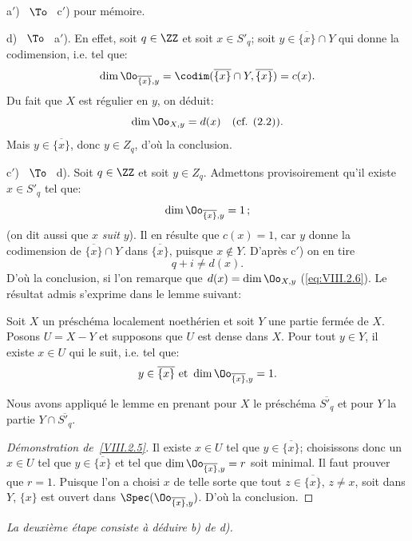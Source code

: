 a$'$) ~$\To$~ c$'$) pour m\'emoire.

d) ~$\To$~ a$'$). En effet, soit $q\in \ZZ$ et soit $x\in S'_q$; soit $y\in\overline{\{x\}}\cap Y$ qui \og donne la codimension\fg, i.e. tel que:
\begin{equation} \label{eq:VIII.2.5} \dim \Oo_{\overline{\{x\}}, y}=\codim(\overline{\{x\}}\cap Y, \overline{\{x\}})=c(x).
\end{equation}
Du fait que $X$ est r\'egulier en $y$, on d\'eduit:
\begin{equation} \label{eq:VIII.2.6} \dim \Oo_{X, y}=d(x)\quad \text{(cf. (2.2)).}
\end{equation}
Mais $y\in\overline{\{x\}}$, donc $y\in Z_q$, d'o\`u la conclusion.

c$'$) ~$\To$~ d). Soit $q\in\ZZ$ et soit $y\in Z_q$. Admettons provisoirement qu'il existe $x\in S'_q$ tel que:
\[
\dim \Oo_{\overline{\{x\}}, y}=1\, \text{;}\]
(on dit aussi que $x$ \emph{suit} $y$). Il en r\'esulte que $c(x)=1$, car $y$ \og donne la codimension de $\overline{\{x\}}\cap Y$ dans $\overline{\{x\}}$\fg, puisque $x\not\in Y$. D'apr\`es c$'$) on en tire
\[q+i\neq d(x).
\]
D'o\`u la conclusion, si l'on remarque que $d(x)=\dim \Oo_{X, y}$ (\ref{eq:VIII.2.6}). Le r\'esultat admis s'exprime dans le lemme suivant:

\begin{lemme} \label{VIII.2.5} Soit $X$ un pr\'esch\'ema localement noeth\'erien et soit $Y$ une partie ferm\'ee de $X$. Posons $U=X-Y$ et supposons que $U$ est dense dans $X$. Pour tout $y\in Y$, il existe $x\in U$ \og qui le suit\fg, i.e. tel que:
\[y\in\overline{\{x\}}\text{ et } \dim\Oo_{\overline{\{x\}}, y}=1.
\]
\end{lemme}

Nous avons appliqu\'e le lemme en prenant pour $X$ le pr\'esch\'ema $\overline{S'_q}$ et pour $Y$ la partie $Y\cap \overline{S'_q}$.

\begin{proof}[D\'emonstration de~\ref{VIII.2.5}]
Il existe $x\in U$ tel que $y\in\overline{\{x\}}$; choisissons donc un $x\in U$ tel que $y\in\overline{\{x\}}$ et tel que $\dim \Oo_{\overline{\{x\}}, y}=r$ soit minimal. Il faut prouver que $r=1$. Puisque l'on a choisi $x$ de telle sorte que tout $z\in\overline{\{x\}}$, $z\neq x$, soit dans $Y$, $\{x\}$ est ouvert dans $\Spec(\Oo_{\overline{\{x\}}, y})$. D'o\`u la conclusion.
\skipqed
\end{proof}

\emph{La deuxième étape consiste à déduire \textup{b)} de \textup{d)}.}

